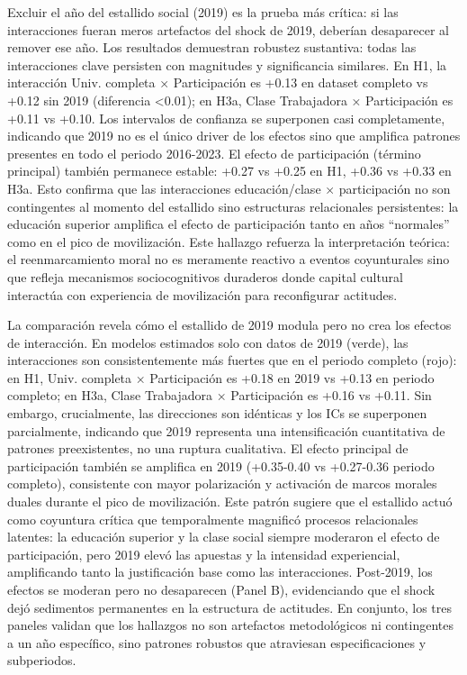 \documentclass[
  13pt,
]{article}
\begin{document}
Excluir el año del estallido social (2019) es la prueba más crítica: si
las interacciones fueran meros artefactos del shock de 2019, deberían
desaparecer al remover ese año. Los resultados demuestran robustez
sustantiva: todas las interacciones clave persisten con magnitudes y
significancia similares. En H1, la interacción Univ. completa ×
Participación es +0.13 en dataset completo vs +0.12 sin 2019 (diferencia
\textless0.01); en H3a, Clase Trabajadora × Participación es +0.11 vs
+0.10. Los intervalos de confianza se superponen casi completamente,
indicando que 2019 no es el único driver de los efectos sino que
amplifica patrones presentes en todo el periodo 2016-2023. El efecto de
participación (término principal) también permanece estable: +0.27 vs
+0.25 en H1, +0.36 vs +0.33 en H3a. Esto confirma que las interacciones
educación/clase × participación no son contingentes al momento del
estallido sino estructuras relacionales persistentes: la educación
superior amplifica el efecto de participación tanto en años ``normales''
como en el pico de movilización. Este hallazgo refuerza la
interpretación teórica: el reenmarcamiento moral no es meramente
reactivo a eventos coyunturales sino que refleja mecanismos
sociocognitivos duraderos donde capital cultural interactúa con
experiencia de movilización para reconfigurar actitudes.

La comparación revela cómo el estallido de 2019 modula pero no crea los
efectos de interacción. En modelos estimados solo con datos de 2019
(verde), las interacciones son consistentemente más fuertes que en el
periodo completo (rojo): en H1, Univ. completa × Participación es +0.18
en 2019 vs +0.13 en periodo completo; en H3a, Clase Trabajadora ×
Participación es +0.16 vs +0.11. Sin embargo, crucialmente, las
direcciones son idénticas y los ICs se superponen parcialmente,
indicando que 2019 representa una intensificación cuantitativa de
patrones preexistentes, no una ruptura cualitativa. El efecto principal
de participación también se amplifica en 2019 (+0.35-0.40 vs +0.27-0.36
periodo completo), consistente con mayor polarización y activación de
marcos morales duales durante el pico de movilización. Este patrón
sugiere que el estallido actuó como coyuntura crítica que temporalmente
magnificó procesos relacionales latentes: la educación superior y la
clase social siempre moderaron el efecto de participación, pero 2019
elevó las apuestas y la intensidad experiencial, amplificando tanto la
justificación base como las interacciones. Post-2019, los efectos se
moderan pero no desaparecen (Panel B), evidenciando que el shock dejó
sedimentos permanentes en la estructura de actitudes. En conjunto, los
tres paneles validan que los hallazgos no son artefactos metodológicos
ni contingentes a un año específico, sino patrones robustos que
atraviesan especificaciones y subperiodos.
\end{document}
